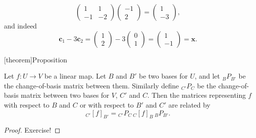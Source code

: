 \documentclass[12pt]{report}
\theoremstyle{definition}
\begin{document}
\begin{ex}
\[\begin{pmatrix}
            1 & 1 \\
            -1 & -2
        \end{pmatrix} \begin{pmatrix}
                -1 \\
                2
        \end{pmatrix} = \begin{pmatrix}
                1 \\
                -3
        \end{pmatrix},
    \]and indeed\[
        \mathbf{c}_1 - 3\mathbf{c}_2 = \begin{pmatrix}
                1 \\
                2
        \end{pmatrix} - 3\begin{pmatrix}
                0 \\
                1
        \end{pmatrix} = \begin{pmatrix}
                1 \\
                -1
        \end{pmatrix} = \mathbf{x}.
    \]
\end{ex} 

[theorem]{Proposition}
\begin{change-of-basis formula}
    Let $f:U\rightarrow V$ be a linear map.
    Let $B$ and $B'$ be two bases for $U$,
    and let ${}_B{P}_{B'}$ be the change-of-basis matrix between them.
    Similarly define ${}_{C'}P_{C}$ be the change-of-basis matrix between 
    two bases for $V$, $C'$ and $C$. Then the matrices representing $f$ with
    respect to $B$ and $C$ or with respect to $B'$ and $C'$ are related by\[
        {}_{C'}{[f]}_{B'} = {}_{C'}P_{C}\,{}_{C}{[f]}_{B}\,{}_{B}P_{B'}.
    \]
\end{change-of-basis formula}

\begin{proof}
    Exercise!
\end{proof} 
\end{document}
